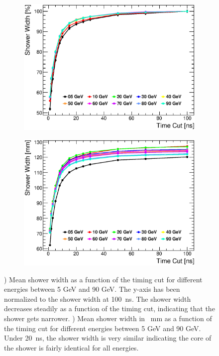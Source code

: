 \begin{figure}[htbp!]
  \centering
  \begin{subfigure}[t]{0.49\textwidth}
    \centering
    \includegraphics[width=1\linewidth]{../Thesis_Plots/ILD/NoSmearing/Plots/ShowerWidth_TimeCuts_noSmearing.eps}
    \caption{} \label{fig:ShowerWidthNoSmearing}
  \end{subfigure}
  \hfill
  \begin{subfigure}[t]{0.49\textwidth}
    \centering
    \includegraphics[width=1\linewidth]{../Thesis_Plots/ILD/NoSmearing/Plots/ShowerWidthAbso_TimeCuts_noSmearing.eps}
    \caption{} \label{fig:ShowerWidthAbsoNoSmearing}
  \end{subfigure}
  \caption{) Mean shower width as a function of the timing cut for different \kzeroL{} energies between 5 GeV and 90 GeV. The y-axis has been normalized to the shower width at \SI{100}{\nano\second}. The shower width decreases steadily as a function of the timing cut, indicating that the shower gets narrower. ) Mean shower width in \SI{}{\milli\meter} as a function of the timing cut for different \kzeroL{} energies between 5 GeV and 90 GeV. Under \SI{20}{\nano\second}, the shower width is very similar indicating the core of the shower is fairly identical for all energies.}
\end{figure}

